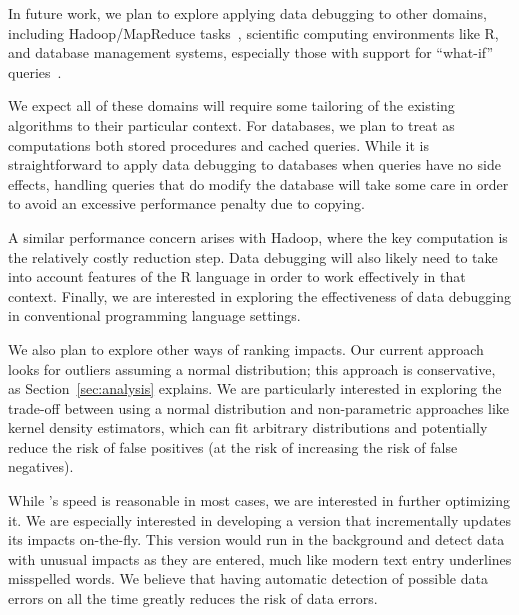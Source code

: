 In future work, we plan to explore applying data debugging to other
domains, including Hadoop/MapReduce tasks~\cite{dean2008mapreduce,hadoop}, scientific
computing environments like R, and database management systems, especially those with
support for ``what-if'' queries~\cite{Balmin:2000:HQO:645926.672016}.

We expect all of these domains will require some tailoring of the
existing algorithms to their particular context. For databases, we
plan to treat as computations both stored procedures and cached
queries. While it is straightforward to apply data debugging to
databases when queries have no side effects, handling queries that do
modify the database will take some care in order to avoid an excessive
performance penalty due to copying.

A similar performance concern arises with Hadoop, where the key
computation is the relatively costly reduction step. Data debugging
will also likely need to take into account features of the R language
in order to work effectively in that context. Finally, we are
interested in exploring the effectiveness of data debugging in
conventional programming language settings.

We also plan to explore other ways of ranking impacts. Our current
approach looks for outliers assuming a normal distribution; this
approach is conservative, as Section~\ref{sec:analysis} explains. We
are particularly interested in exploring the trade-off between using a
normal distribution and non-parametric approaches like kernel
density estimators, which can fit arbitrary distributions and
potentially reduce the risk of false positives (at the risk of
increasing the risk of false negatives).

While \checkcell{}'s speed is reasonable in most cases, we are
interested in further optimizing it. We are especially interested in
developing a version that incrementally updates its impacts
on-the-fly. This version would run in the background and detect 
data with unusual impacts as they are entered, much like modern text entry
underlines misspelled words. We believe that having automatic
detection of possible data errors on all the time greatly reduces the
risk of data errors.
